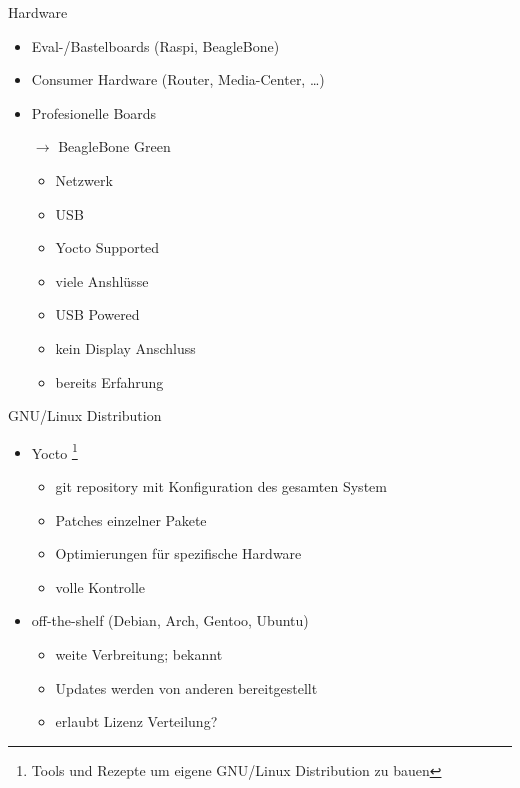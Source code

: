 \begin{frame}{Hardware}
	\begin{itemize}
		\item Eval-/Bastelboards (Raspi, BeagleBone)
		\item Consumer Hardware (Router, Media-Center, \ldots)
		\item Profesionelle Boards
		\item[$\rightarrow$] BeagleBone Green
		\begin{itemize}
			\item Netzwerk
			\item USB
			\item Yocto Supported
			\item viele Anshlüsse
			\item USB Powered
			\item kein Display Anschluss
			\item bereits Erfahrung
		\end{itemize}
	\end{itemize}
\end{frame}

\begin{frame}{GNU/Linux Distribution}
	\begin{itemize}
		\item Yocto\cite{whyYocto} \footnote{Tools und Rezepte um eigene GNU/Linux Distribution zu bauen}
		\begin{itemize}
			\item git repository mit Konfiguration des gesamten System
			\item Patches einzelner Pakete
			\item Optimierungen für spezifische Hardware
			\item volle Kontrolle
		\end{itemize}
		\item off-the-shelf (Debian, Arch, Gentoo, Ubuntu)
		\begin{itemize}
			\item weite Verbreitung; bekannt
			\item Updates werden von anderen bereitgestellt
			\item erlaubt Lizenz Verteilung?
		\end{itemize}
	\end{itemize}
\end{frame}

